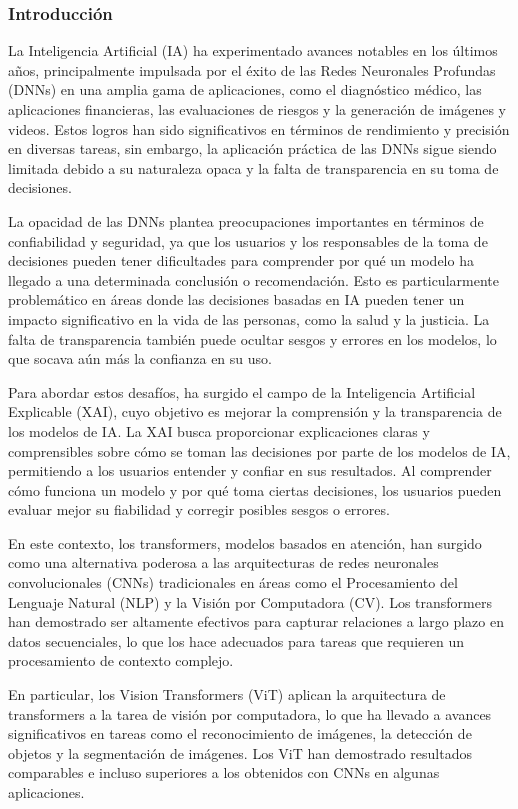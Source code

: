  \subsubsection{Introducción}
 La Inteligencia Artificial (IA) ha experimentado avances notables en los últimos años, principalmente impulsada por el éxito de las Redes Neuronales Profundas (DNNs) en una amplia gama de aplicaciones, como el diagnóstico médico, las aplicaciones financieras, las evaluaciones de riesgos y la generación de imágenes y videos. Estos logros han sido significativos en términos de rendimiento y precisión en diversas tareas, sin embargo, la aplicación práctica de las DNNs sigue siendo limitada debido a su naturaleza opaca y la falta de transparencia en su toma de decisiones.
 
 La opacidad de las DNNs plantea preocupaciones importantes en términos de confiabilidad y seguridad, ya que los usuarios y los responsables de la toma de decisiones pueden tener dificultades para comprender por qué un modelo ha llegado a una determinada conclusión o recomendación. Esto es particularmente problemático en áreas donde las decisiones basadas en IA pueden tener un impacto significativo en la vida de las personas, como la salud y la justicia. La falta de transparencia también puede ocultar sesgos y errores en los modelos, lo que socava aún más la confianza en su uso.
 
 Para abordar estos desafíos, ha surgido el campo de la Inteligencia Artificial Explicable (XAI), cuyo objetivo es mejorar la comprensión y la transparencia de los modelos de IA. La XAI busca proporcionar explicaciones claras y comprensibles sobre cómo se toman las decisiones por parte de los modelos de IA, permitiendo a los usuarios entender y confiar en sus resultados. Al comprender cómo funciona un modelo y por qué toma ciertas decisiones, los usuarios pueden evaluar mejor su fiabilidad y corregir posibles sesgos o errores.
 
 En este contexto, los transformers, modelos basados en atención, han surgido como una alternativa poderosa a las arquitecturas de redes neuronales convolucionales (CNNs) tradicionales en áreas como el Procesamiento del Lenguaje Natural (NLP) y la Visión por Computadora (CV). Los transformers han demostrado ser altamente efectivos para capturar relaciones a largo plazo en datos secuenciales, lo que los hace adecuados para tareas que requieren un procesamiento de contexto complejo.
 
 En particular, los Vision Transformers (ViT) aplican la arquitectura de transformers a la tarea de visión por computadora, lo que ha llevado a avances significativos en tareas como el reconocimiento de imágenes, la detección de objetos y la segmentación de imágenes. Los ViT han demostrado resultados comparables e incluso superiores a los obtenidos con CNNs en algunas aplicaciones.
 
